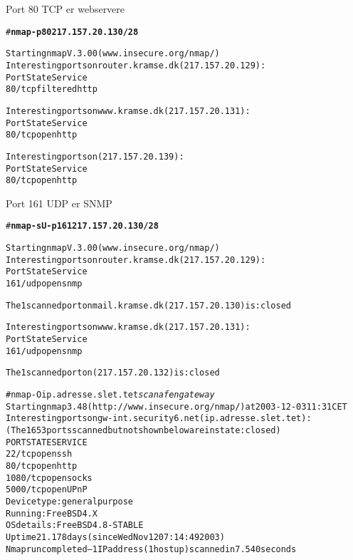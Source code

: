 
\begin{list1}
  \item Port 80 TCP er webservere
\end{list1}

\begin{alltt}
\small # {\bfseries nmap  -p 80 217.157.20.130/28}

Starting nmap V. 3.00 ( www.insecure.org/nmap/ )
Interesting ports on router.kramse.dk (217.157.20.129):
Port       State       Service
80/tcp     filtered    http                    

Interesting ports on www.kramse.dk (217.157.20.131):
Port       State       Service
80/tcp     open        http                    

Interesting ports on  (217.157.20.139):
Port       State       Service
80/tcp     open        http                    

\end{alltt}


\begin{list1}
  \item Port 161 UDP er SNMP
\end{list1}

\begin{alltt}  
\small # {\bfseries nmap -sU -p 161 217.157.20.130/28}

Starting nmap V. 3.00 ( www.insecure.org/nmap/ )
Interesting ports on router.kramse.dk (217.157.20.129):
Port       State       Service
161/udp    open        snmp                    

The 1 scanned port on mail.kramse.dk (217.157.20.130) is: closed

Interesting ports on www.kramse.dk (217.157.20.131):
Port       State       Service
161/udp    open        snmp                    

The 1 scanned port on  (217.157.20.132) is: closed
\end{alltt}

\begin{alltt}
\footnotesize
# nmap -O ip.adresse.slet.tet \emph{scan af en gateway}
Starting nmap 3.48 ( http://www.insecure.org/nmap/ ) at 2003-12-03 11:31 CET
Interesting ports on gw-int.security6.net (ip.adresse.slet.tet):
(The 1653 ports scanned but not shown below are in state: closed)
PORT     STATE SERVICE
22/tcp   open  ssh
80/tcp   open  http
1080/tcp open  socks
5000/tcp open  UPnP
Device type: general purpose
Running: FreeBSD 4.X
OS details: FreeBSD 4.8-STABLE
Uptime 21.178 days (since Wed Nov 12 07:14:49 2003)
Nmap run completed -- 1 IP address (1 host up) scanned in 7.540 seconds
\end{alltt}

